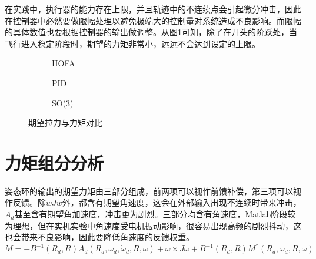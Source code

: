 在实践中，执行器的能力存在上限，并且轨迹中的不连续点会引起微分冲击，因此在控制器中必然要做限幅处理以避免极端大的控制量对系统造成不良影响。而限幅的具体数值也要根据控制器的输出做调整。从图\ref{matlab_fM}可知，除了在开头的阶跃处，当飞行进入稳定阶段时，期望的力矩非常小，远远不会达到设定的上限。
\begin{figure}[h]
  \centering
  \begin{subfigure}[t]{0.33\textwidth}
    \centering
    \caption{HOFA}
  \end{subfigure}\hfill
  \begin{subfigure}[t]{0.33\textwidth}
    \centering
    \caption{PID}
  \end{subfigure}\hfill
  \begin{subfigure}[t]{0.33\textwidth}
    \centering
    \caption{SO(3)}
  \end{subfigure}
  \caption{期望拉力与力矩对比}
  \label{matlab_fM}
\end{figure}


\section{力矩组分分析}
姿态环的输出的期望力矩由三部分组成，前两项可以视作前馈补偿，第三项可以视作反馈。除$wJw$外，都含有期望角速度，这会在外部输入出现不连续时带来冲击，$A_d$甚至含有期望角加速度，冲击更为剧烈。三部分均含有角速度，Matlab阶段较为理想，但在实机实验中角速度受电机振动影响，很容易出现高频的剧烈抖动，这也会带来不良影响，因此要降低角速度的反馈权重。
$$M=-B^{-1}(R_d,R) A_d(R_d,\omega_d,\dot \omega_d,R,\omega)+\omega \times J\omega +B^{-1}(R_d,R)M^*(R_d,\omega_d,R,\omega)$$

